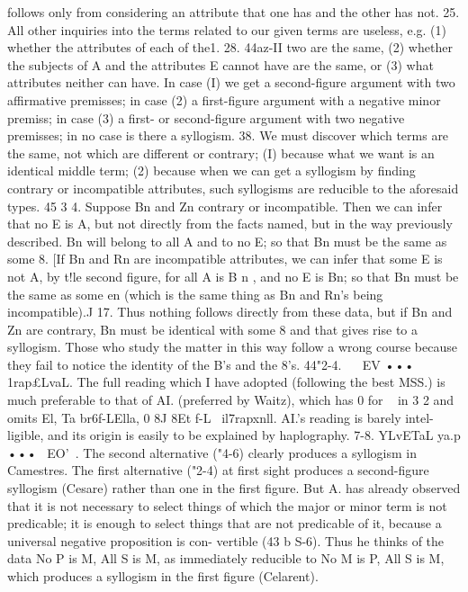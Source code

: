 {{{{{{{{{{{{{{{{{{{follows only from considering an attribute that one has and the
other has not.
25. All other inquiries into the terms related to our given
terms are useless, e.g. (1) whether the attributes of each of the1. 28. 44az-II
two are the same, (2) whether the subjects of A and the attributes
E cannot have are the same, or (3) what attributes neither can
have. In case (I) we get a second-figure argument with two
affirmative premisses; in case (2) a first-figure argument with a
negative minor premiss; in case (3) a first- or second-figure
argument with two negative premisses; in no case is there a
syllogism.
38. We must discover which terms are the same, not which are
different or contrary; (I) because what we want is an identical
middle term; (2) because when we can get a syllogism by finding
contrary or incompatible attributes, such syllogisms are reducible
to the aforesaid types.
45 3 4. Suppose Bn and Zn contrary or incompatible. Then we
can infer that no E is A, but not directly from the facts named,
but in the way previously described. Bn will belong to all A and
to no E; so that Bn must be the same as some 8. [If Bn and Rn
are incompatible attributes, we can infer that some E is not A,
by t!le second figure, for all A is B n , and no E is Bn; so that Bn
must be the same as some en (which is the same thing as Bn and
Rn's being incompatible).J
17. Thus nothing follows directly from these data, but if Bn
and Zn are contrary, Bn must be identical with some 8 and that
gives rise to a syllogism. Those who study the matter in this way
follow a wrong course because they fail to notice the identity of
the B's and the 8's.
44"2-4. ~ ~EV ••• 1rap£LvaL. The full reading which I have
adopted (following the best MSS.) is much preferable to that
of AI. (preferred by Waitz), which has 0 for ~ in 3 2 and omits
El, Ta br6f-LElla, 0 8J 8Et f-L~ il7rapxnll. AI.'s reading is barely intel-
ligible, and its origin is easily to be explained by haplography.
7-8. YLvETaL ya.p ••• ~EO'~. The second alternative ("4-6)
clearly produces a syllogism in Camestres. The first alternative
("2-4) at first sight produces a second-figure syllogism (Cesare)
rather than one in the first figure. But A. has already observed
that it is not necessary to select things of which the major or minor
term is not predicable; it is enough to select things that are not
predicable of it, because a universal negative proposition is con-
vertible (43 b S-6). Thus he thinks of the data No P is M, All S
is M, as immediately reducible to No M is P, All S is M, which
produces a syllogism in the first figure (Celarent).
}}}}}}}}}}}}}}}}}}}

